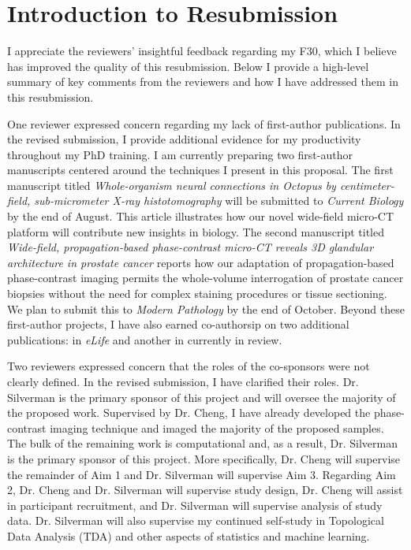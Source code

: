 \documentclass{nihgrant}
\begin{document}
\part*{Introduction to Resubmission}

I appreciate the reviewers' insightful feedback regarding my F30, which I believe has improved the quality of this resubmission. Below I provide a high-level summary of key comments from the reviewers and how I have addressed them in this resubmission.

One reviewer expressed concern regarding my lack of first-author publications. In the revised submission, I provide additional evidence for my productivity throughout my PhD training. I am currently preparing two first-author manuscripts centered around the techniques I present in this proposal. The first manuscript titled \textit{Whole-organism neural connections in Octopus by centimeter-field, sub-micrometer X-ray histotomography} will be submitted to \textit{Current Biology} by the end of August. This article illustrates how our novel wide-field micro-CT platform will contribute new insights in biology. The second manuscript titled \textit{Wide-field, propagation-based phase-contrast micro-CT reveals 3D glandular architecture in prostate cancer} reports how our adaptation of propagation-based phase-contrast imaging permits the whole-volume interrogation of prostate cancer biopsies without the need for complex staining procedures or tissue sectioning. We plan to submit this to \textit{Modern Pathology} by the end of October. Beyond these first-author projects, I have also earned co-authorsip on two additional publications: in \textit{eLife} and another in currently in review.

Two reviewers expressed concern that the roles of the co-sponsors were not clearly defined. In the revised submission, I have clarified their roles. Dr. Silverman is the primary sponsor of this project and will oversee the majority of the proposed work. Supervised by Dr. Cheng, I have already developed the phase-contrast imaging technique and imaged the majority of the proposed samples. The bulk of the remaining work is computational and, as a result, Dr. Silverman is the primary sponsor of this project. More specifically, Dr. Cheng will supervise the remainder of Aim 1 and Dr. Silverman will supervise Aim 3. Regarding Aim 2, Dr. Cheng and Dr. Silverman will supervise study design, Dr. Cheng will assist in participant recruitment, and Dr. Silverman will supervise analysis of study data. Dr. Silverman will also supervise my continued self-study in Topological Data Analysis (TDA) and other aspects of statistics and machine learning.
\end{document}
